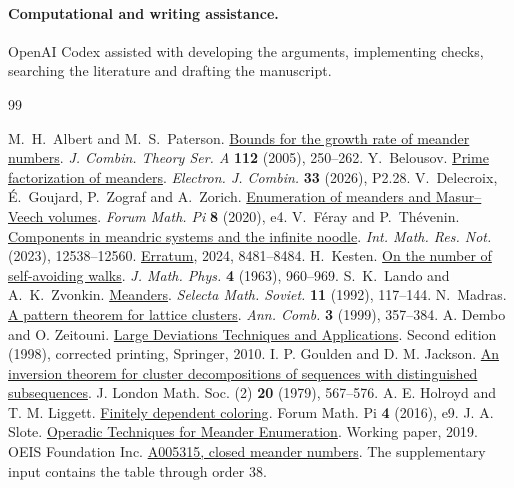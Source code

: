 \documentclass[11pt]{article}
\begin{document}
\paragraph{Computational and writing assistance.}
OpenAI Codex assisted with developing the arguments, implementing checks,
searching the literature and drafting the manuscript.
\begingroup\small
\begin{thebibliography}{99}\setlength{\itemsep}{1pt}

 M.\ H.\ Albert and M.\ S.\ Paterson.
\href{https://doi.org/10.1016/j.jcta.2005.02.006}{Bounds for the growth rate of meander numbers}.
\emph{J. Combin. Theory Ser. A} \textbf{112} (2005), 250--262.
 Y.\ Belousov. \href{https://doi.org/10.37236/13636}{Prime factorization of meanders}.
\emph{Electron. J. Combin.} \textbf{33} (2026), P2.28.
 V.\ Delecroix, É.\ Goujard, P.\ Zograf and A.\ Zorich.
\href{https://arxiv.org/abs/1705.05190}{Enumeration of meanders and Masur--Veech volumes}.
\emph{Forum Math. Pi} \textbf{8} (2020), e4.
 V.\ Féray and P.\ Thévenin.
\href{https://academic.oup.com/imrn/article/2023/14/12538/6646026}{Components in meandric systems and the infinite noodle}.
\emph{Int. Math. Res. Not.} (2023), 12538--12560. \href{https://doi.org/10.1093/imrn/rnad282}{Erratum}, 2024, 8481--8484.
 H.\ Kesten. \href{https://doi.org/10.1063/1.1704022}{On the number of self-avoiding walks}.
\emph{J. Math. Phys.} \textbf{4} (1963), 960--969.
 S.\ K.\ Lando and A.\ K.\ Zvonkin.
\href{https://www.labri.fr/perso/zvonkin/Research/Meanders-1992.pdf}{Meanders}.
\emph{Selecta Math. Soviet.} \textbf{11} (1992), 117--144.
 N.\ Madras. \href{https://arxiv.org/abs/math/9902161}{A pattern theorem for lattice clusters}.
\emph{Ann. Comb.} \textbf{3} (1999), 357--384.
 A. Dembo and O. Zeitouni.
\href{https://doi.org/10.1007/978-3-642-03311-7}{Large Deviations Techniques and Applications}.
Second edition (1998), corrected printing, Springer, 2010.
 I. P. Goulden and D. M. Jackson.
\href{https://doi.org/10.1112/jlms/s2-20.3.567}{An inversion theorem for cluster decompositions of sequences with distinguished subsequences}.
J. London Math. Soc. (2) \textbf{20} (1979), 567--576.
 A. E. Holroyd and T. M. Liggett.
\href{https://arxiv.org/abs/1403.2448}{Finitely dependent coloring}.
Forum Math. Pi \textbf{4} (2016), e9.
 J. A. Slote.
\href{https://joeslote.com/documents/operadic_techniques_meanders_WIP.pdf}{Operadic Techniques for Meander Enumeration}.
Working paper, 2019.
 OEIS Foundation Inc.
\href{https://oeis.org/A005315}{A005315, closed meander numbers}.
The supplementary input contains the table through order 38.
\end{thebibliography}
\endgroup
\end{document}
